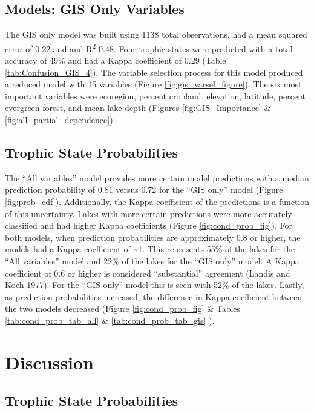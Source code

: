 \documentclass[12pt,]{article}
\begin{document}
\subsection{Models: GIS Only Variables}\label{models-gis-only-variables}

The GIS only model was built using 1138 total observations, had a mean
squared error of 0.22 and and R\textsuperscript{2} 0.48. Four trophic
states were predicted with a total accuracy of 49\% and had a Kappa
coefficient of 0.29 (Table \ref{tab:Confusion_GIS_4}). The variable
selection process for this model produced a reduced model with 15
variables (Figure \ref{fig:gis_varsel_figure}). The six most important
variables were ecoregion, percent cropland, elevation, latitude, percent
evergreen forest, and mean lake depth (Figures \ref{fig:GIS_Importance}
\& \ref{fig:all_partial_dependence}).

\subsection{Trophic State
Probabilities}\label{trophic-state-probabilities-1}

The ``All variables'' model provides more certain model predictions with
a median prediction probability of 0.81 versus 0.72 for the ``GIS only''
model (Figure \ref{fig:prob_cdf}). Additionally, the Kappa coefficient
of the predictions is a function of this uncertainty. Lakes with more
certain predictions were more accurately classified and had higher Kappa
coefficients (Figure \ref{fig:cond_prob_fig}). For both models, when
prediction probabilities are approximately 0.8 or higher, the models had
a Kappa coefficient of \textasciitilde{}1. This represents 55\% of the
lakes for the ``All variables'' model and 22\% of the lakes for the
``GIS only'' model. A Kappa coefficient of 0.6 or higher is considered
``substantial'' agreement (Landis and Koch 1977). For the ``GIS only''
model this is seen with 52\% of the lakes. Lastly, as prediction
probabilities increased, the difference in Kappa coefficient between the
two models decreased (Figure \ref{fig:cond_prob_fig} \& Tables
\ref{tab:cond_prob_tab_all} \& \ref{tab:cond_prob_tab_gis} ).

\section{Discussion}\label{discussion}

\subsection{Trophic State
Probabilities}\label{trophic-state-probabilities-2}
\end{document}
